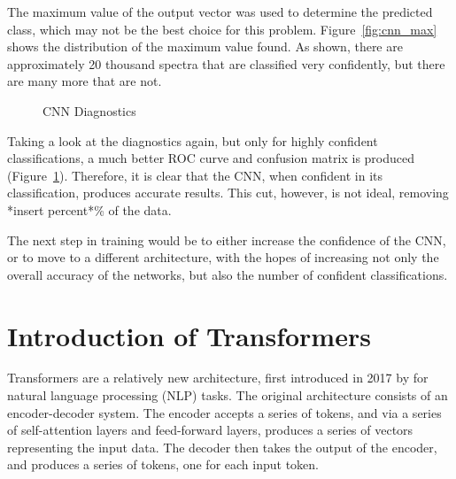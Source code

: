 The maximum value of the output vector was used to determine the predicted class,
which may not be the best choice for this problem. Figure~\ref{fig:cnn_max} shows
the distribution of the maximum value found. As shown, there are approximately 
20 thousand spectra that are classified very confidently, but there are many
more that are not.
\begin{figure}[h]
    \centering
    \qquad
    \caption{CNN Diagnostics\label{fig:cnn_qual2}}
\end{figure}

Taking a look at the diagnostics again, but only for highly confident classifications,
a much better ROC curve and confusion matrix is produced (Figure~\ref{fig:cnn_qual2}). 
Therefore, it is clear that the CNN, when confident in its classification, produces 
accurate results. This cut, however, is not ideal, removing *insert percent*\% of the 
data. 

The next step in training would be to either increase the confidence of the CNN, 
or to move to a different architecture, with the hopes of increasing not only 
the overall accuracy of the networks, but also the number of confident classifications.

\section{Introduction of Transformers}\label{sec:transformers}
Transformers are a relatively new architecture, first introduced in 2017 by \textcite{vaswani2017}
for natural language processing (NLP) tasks. The original architecture consists of 
an encoder-decoder system. The encoder accepts a series of tokens, and via a series 
of self-attention layers and feed-forward layers, produces a series of vectors
representing the input data. The decoder then takes the output of the encoder, and
produces a series of tokens, one for each input token. 

